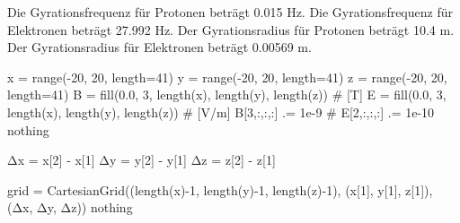 \documentclass[
  a4paper,
  DIV=11]{scrreprt}
\newenvironment{Shaded}{\begin{snugshade}}{\end{snugshade}}
\newcommand{\CommentTok}[1]{\textcolor[rgb]{0.37,0.37,0.37}{#1}}
\newcommand{\ConstantTok}[1]{\textcolor[rgb]{0.56,0.35,0.01}{#1}}
\newcommand{\FloatTok}[1]{\textcolor[rgb]{0.68,0.00,0.00}{#1}}
\newcommand{\FunctionTok}[1]{\textcolor[rgb]{0.28,0.35,0.67}{#1}}
\newcommand{\NormalTok}[1]{\textcolor[rgb]{0.00,0.23,0.31}{#1}}
\newcommand{\OperatorTok}[1]{\textcolor[rgb]{0.37,0.37,0.37}{#1}}
\begin{document}
Die Gyrationsfrequenz für Protonen beträgt 0.015 Hz. Die
Gyrationsfrequenz für Elektronen beträgt 27.992 Hz. Der Gyrationsradius
für Protonen beträgt 10.4 m. Der Gyrationsradius für Elektronen beträgt
0.00569 m.

\begin{Shaded}
\begin{Highlighting}[]
\NormalTok{x }\OperatorTok{=} \FunctionTok{range}\NormalTok{(}\OperatorTok{{-}}\FloatTok{20}\NormalTok{, }\FloatTok{20}\NormalTok{, length}\OperatorTok{=}\FloatTok{41}\NormalTok{)}
\NormalTok{y }\OperatorTok{=} \FunctionTok{range}\NormalTok{(}\OperatorTok{{-}}\FloatTok{20}\NormalTok{, }\FloatTok{20}\NormalTok{, length}\OperatorTok{=}\FloatTok{41}\NormalTok{)}
\NormalTok{z }\OperatorTok{=} \FunctionTok{range}\NormalTok{(}\OperatorTok{{-}}\FloatTok{20}\NormalTok{, }\FloatTok{20}\NormalTok{, length}\OperatorTok{=}\FloatTok{41}\NormalTok{)}
\NormalTok{B }\OperatorTok{=} \FunctionTok{fill}\NormalTok{(}\FloatTok{0.0}\NormalTok{, }\FloatTok{3}\NormalTok{, }\FunctionTok{length}\NormalTok{(x), }\FunctionTok{length}\NormalTok{(y), }\FunctionTok{length}\NormalTok{(z)) }\CommentTok{\# [T]}
\NormalTok{E }\OperatorTok{=} \FunctionTok{fill}\NormalTok{(}\FloatTok{0.0}\NormalTok{, }\FloatTok{3}\NormalTok{, }\FunctionTok{length}\NormalTok{(x), }\FunctionTok{length}\NormalTok{(y), }\FunctionTok{length}\NormalTok{(z)) }\CommentTok{\# [V/m]}
\NormalTok{B[}\FloatTok{3}\NormalTok{,}\OperatorTok{:}\NormalTok{,}\OperatorTok{:}\NormalTok{,}\OperatorTok{:}\NormalTok{] }\OperatorTok{.=} \FloatTok{1e{-}9}
\CommentTok{\# E[2,:,:,:] .= 1e{-}10}
\ConstantTok{nothing}
\end{Highlighting}
\end{Shaded}

\begin{Shaded}
\begin{Highlighting}[]
\NormalTok{Δx }\OperatorTok{=}\NormalTok{ x[}\FloatTok{2}\NormalTok{] }\OperatorTok{{-}}\NormalTok{ x[}\FloatTok{1}\NormalTok{]}
\NormalTok{Δy }\OperatorTok{=}\NormalTok{ y[}\FloatTok{2}\NormalTok{] }\OperatorTok{{-}}\NormalTok{ y[}\FloatTok{1}\NormalTok{]}
\NormalTok{Δz }\OperatorTok{=}\NormalTok{ z[}\FloatTok{2}\NormalTok{] }\OperatorTok{{-}}\NormalTok{ z[}\FloatTok{1}\NormalTok{]}

\NormalTok{grid }\OperatorTok{=} \FunctionTok{CartesianGrid}\NormalTok{((}\FunctionTok{length}\NormalTok{(x)}\OperatorTok{{-}}\FloatTok{1}\NormalTok{, }\FunctionTok{length}\NormalTok{(y)}\OperatorTok{{-}}\FloatTok{1}\NormalTok{, }\FunctionTok{length}\NormalTok{(z)}\OperatorTok{{-}}\FloatTok{1}\NormalTok{),}
\NormalTok{   (x[}\FloatTok{1}\NormalTok{], y[}\FloatTok{1}\NormalTok{], z[}\FloatTok{1}\NormalTok{]),}
\NormalTok{   (Δx, Δy, Δz))}
\ConstantTok{nothing}
\end{Highlighting}
\end{Shaded}
\end{document}
